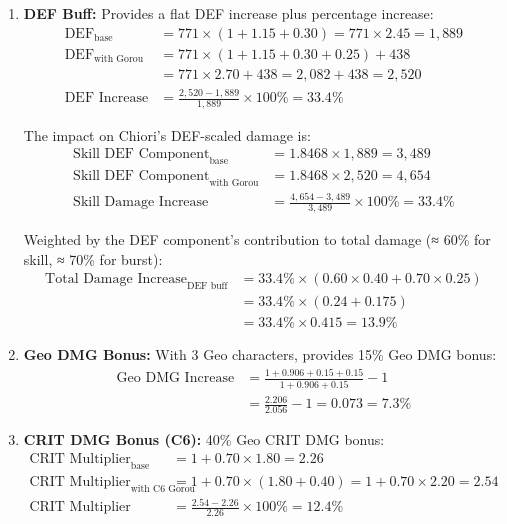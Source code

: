 \documentclass[12pt,a4paper]{article}
\begin{document}
\begin{enumerate}
    \item \textbf{DEF Buff:} Provides a flat DEF increase plus percentage increase:
    \begin{align}
    \text{DEF}_{\text{base}} &= 771 \times (1 + 1.15 + 0.30) = 771 \times 2.45 = 1,889 \\
    \text{DEF}_{\text{with Gorou}} &= 771 \times (1 + 1.15 + 0.30 + 0.25) + 438 \\
    &= 771 \times 2.70 + 438 = 2,082 + 438 = 2,520 \\
    \text{DEF Increase} &= \frac{2,520 - 1,889}{1,889} \times 100\% = 33.4\%
    \end{align}
    
    The impact on Chiori's DEF-scaled damage is:
    \begin{align}
    \text{Skill DEF Component}_{\text{base}} &= 1.8468 \times 1,889 = 3,489 \\
    \text{Skill DEF Component}_{\text{with Gorou}} &= 1.8468 \times 2,520 = 4,654 \\
    \text{Skill Damage Increase} &= \frac{4,654 - 3,489}{3,489} \times 100\% = 33.4\%
    \end{align}
    
    Weighted by the DEF component's contribution to total damage (≈ 60\% for skill, ≈ 70\% for burst):
    \begin{align}
    \text{Total Damage Increase}_{\text{DEF buff}} &= 33.4\% \times (0.60 \times 0.40 + 0.70 \times 0.25) \\
    &= 33.4\% \times (0.24 + 0.175) \\
    &= 33.4\% \times 0.415 = 13.9\%
    \end{align}
    
    \item \textbf{Geo DMG Bonus:} With 3 Geo characters, provides 15\% Geo DMG bonus:
    \begin{align}
    \text{Geo DMG Increase} &= \frac{1 + 0.906 + 0.15 + 0.15}{1 + 0.906 + 0.15} - 1 \\
    &= \frac{2.206}{2.056} - 1 = 0.073 = 7.3\%
    \end{align}
    
    \item \textbf{CRIT DMG Bonus (C6):} 40\% Geo CRIT DMG bonus:
    \begin{align}
    \text{CRIT Multiplier}_{\text{base}} &= 1 + 0.70 \times 1.80 = 2.26 \\
    \text{CRIT Multiplier}_{\text{with C6 Gorou}} &= 1 + 0.70 \times (1.80 + 0.40) = 1 + 0.70 \times 2.20 = 2.54 \\
    \text{CRIT Multiplier Increase} &= \frac{2.54 - 2.26}{2.26} \times 100\% = 12.4\%
    \end{align}
\end{enumerate}
\end{document}
